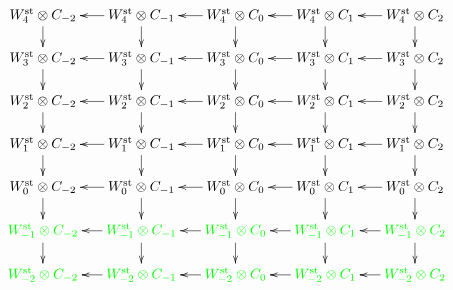 
\[
	\xymatrix@R=.5cm@C=.5cm{
		\Wst[4] \ot  C_{-2}\ar[d] &
		\Wst[4] \ot  C_{-1}\ar[d]\ar[l] &
		\Wst[4] \ot  C_{0}\ar[d]\ar[l] &
		\Wst[4] \ot  C_{1}\ar[d]\ar[l] &
		\Wst[4] \ot  C_{2}\ar[d]\ar[l]
		\\
		\Wst[3] \ot  C_{-2}\ar[d] &
		\Wst[3] \ot  C_{-1}\ar[d]\ar[l] &
		\Wst[3] \ot  C_{0}\ar[d]\ar[l] &
		\Wst[3] \ot  C_{1}\ar[d]\ar[l] &
		\Wst[3] \ot  C_{2}\ar[d]\ar[l]
		\\
		\Wst[2] \ot  C_{-2}\ar[d] &
		\Wst[2] \ot  C_{-1}\ar[d]\ar[l] &
		\Wst[2] \ot  C_{0}\ar[d]\ar[l] &
		\Wst[2] \ot  C_{1}\ar[d]\ar[l] &
		\Wst[2] \ot  C_{2}\ar[d]\ar[l]
		\\
		\Wst[1] \ot  C_{-2}\ar[d] &
		\Wst[1] \ot  C_{-1}\ar[d]\ar[l] &
		\Wst[1] \ot  C_{0}\ar[d]\ar[l] &
		\Wst[1] \ot  C_{1}\ar[d]\ar[l] &
		\Wst[1] \ot  C_{2}\ar[d]\ar[l]
		\\
		\Wst[0] \ot  C_{-2}\ar[d] &
		\Wst[0] \ot  C_{-1}\ar[d]\ar[l] &
		\Wst[0] \ot  C_{0}\ar[d]\ar[l] &
		\Wst[0] \ot  C_{1}\ar[d]\ar[l] &
		\Wst[0] \ot  C_{2}\ar[d]\ar[l]
		\\
		\green{\Wst[-1] \ot  C_{-2}}\ar[d] &
		\green{\Wst[-1] \ot  C_{-1}}\ar[d]\ar[l] &
		\green{\Wst[-1] \ot  C_{0}}\ar[d]\ar[l] &
		\green{\Wst[-1] \ot  C_{1}}\ar[d]\ar[l] &
		\green{\Wst[-1] \ot  C_{2}}\ar[d]\ar[l]
		\\
		\green{\Wst[-2] \ot  C_{-2}} &
		\green{\Wst[-2] \ot  C_{-1}}\ar[l] &
		\green{\Wst[-2] \ot  C_{0}}\ar[l] &
		\green{\Wst[-2] \ot  C_{1}}\ar[l] &
		\green{\Wst[-2] \ot  C_{2}}\ar[l]
}
\]
